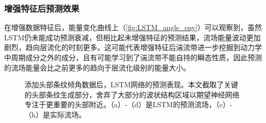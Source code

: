 \subsubsection{增强特征后预测效果}
在增强数据特征后，能量变化曲线上（\ref{fig:LSTM_angle_eny}）可以观察到，虽然LSTM仍未能成功预测衰减，但相比起未增强特征的预测结果，流场能量波动更加剧烈，趋向层流化的时刻更多。这可能代表增强特征后湍流带进一步挖掘到动力学中周期成分之外的成分，且有可能学习到了湍流带不能自持的瞬态性质，因此预测的流场能量会比之前更多的趋向于层流化级别的能量大小。
\begin{figure}[H]
	\begin{minipage}[h]{0.24\linewidth}
	\centering
	\end{minipage}
	\begin{minipage}[h]{0.24\linewidth}
	\centering
	\end{minipage}
	\begin{minipage}[h]{0.24\linewidth}
	\centering
	\end{minipage}
	\begin{minipage}[h]{0.24\linewidth}
	\centering
	\end{minipage}
	
	\begin{minipage}[h]{0.24\linewidth}
	\centering
	\end{minipage}
	\begin{minipage}[h]{0.24\linewidth}
	\centering
	\end{minipage}
	\begin{minipage}[h]{0.24\linewidth}
	\centering
	\end{minipage}
	\begin{minipage}[h]{0.24\linewidth}
	\centering
	\end{minipage}
	\caption{添加头部条纹倾角数据后，LSTM网络的预测表现。本文截取了关键的头部条纹生成部分，舍弃了大部分的波状结构区域以期望神经网络专注于更重要的头部附近。（a）-（d）是LSTM的预测流场，（e）-（h）是实际流场。}
\label{fig:4010angle_performance}
\end{figure}
